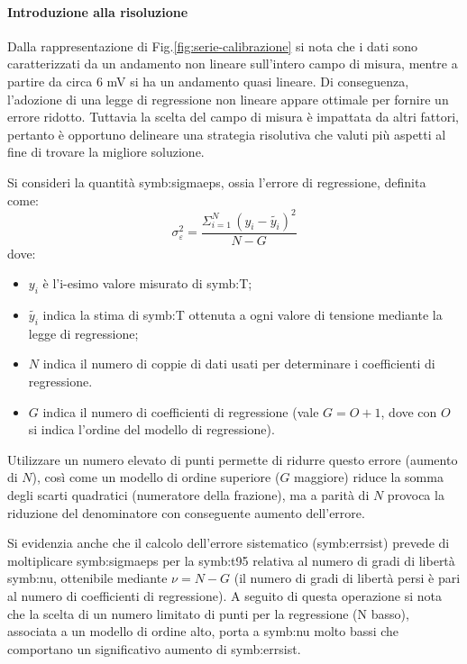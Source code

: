 \paragraph{Introduzione alla risoluzione}
Dalla rappresentazione di Fig.\ref{fig:serie-calibrazione} si nota che i dati sono caratterizzati da un andamento non lineare sull'intero campo di misura, mentre a partire da circa 6 mV si ha un andamento quasi lineare.
Di conseguenza, l'adozione di una legge di regressione non lineare appare ottimale per fornire un errore ridotto. Tuttavia la scelta del campo di misura è impattata da altri fattori, pertanto è opportuno delineare una strategia risolutiva che valuti più aspetti al fine di trovare la migliore soluzione. 


Si consideri la quantità \gls{symb:sigmaeps}, ossia l'errore di regressione, definita come:
\begin{equation}
	\sigma_{\varepsilon}^2= \frac{\Sigma_{i=1}^N \, (y_i - \tilde{y_i})^2}{N-G} 
\end{equation}
dove: 
\begin{itemize}
	\item $y_i$ è l'i-esimo valore misurato di \gls{symb:T};
	\item $\tilde{y_i}$ indica la stima di \gls{symb:T} ottenuta a ogni valore di tensione mediante la legge di regressione;
	\item $N$ indica il numero di coppie di dati usati per determinare i coefficienti di regressione. 
	\item $G$ indica il numero di coefficienti di regressione (vale $G = O + 1$, dove con $O$ si indica l'ordine del modello di regressione).
\end{itemize}
Utilizzare un numero elevato di punti permette di ridurre questo errore (aumento di $N$), così come un modello di ordine superiore ($G$ maggiore) riduce la somma degli scarti quadratici (numeratore della frazione), ma a parità di $N$ provoca la riduzione del denominatore con conseguente aumento dell'errore. 

Si evidenzia anche che il calcolo dell'errore sistematico (\gls{symb:errsist}) prevede di moltiplicare \gls{symb:sigmaeps} per la \gls{symb:t95} relativa al numero di gradi di libertà \gls{symb:nu}, ottenibile mediante $ \nu = N - G $ (il numero di gradi di libertà persi è pari al numero di coefficienti di regressione). A seguito di questa operazione si nota che la scelta di un numero limitato di punti per la regressione (N basso), associata a un modello di ordine alto, porta a \gls{symb:nu} molto bassi che comportano un significativo aumento di \gls{symb:errsist}.

